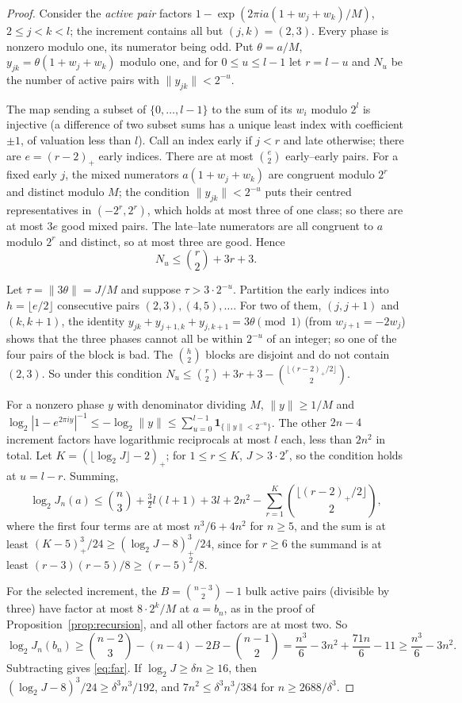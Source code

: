 \documentclass[11pt,a4paper]{article}
\theoremstyle{definition}
\begin{document}
\begin{proof}
Consider the \emph{active pair} factors $1-\exp(2\pi ia(1+w_j+w_k)/M)$,
$2\le j<k<l$; the increment contains all but $(j,k)=(2,3)$. Every phase is
nonzero modulo one, its numerator being odd. Put $\theta=a/M$,
$y_{jk}=\theta(1+w_j+w_k)$ modulo one, and for $0\le u\le l-1$ let $r=l-u$ and
$N_u$ be the number of active pairs with $\|y_{jk}\|<2^{-u}$.

The map sending a subset of $\{0,\dots,l-1\}$ to the sum of its $w_i$ modulo
$2^l$ is injective (a difference of two subset sums has a unique least index
with coefficient $\pm1$, of valuation less than $l$). Call an index early if
$j<r$ and late otherwise; there are $e=(r-2)_+$ early indices. There are at
most $\binom e2$ early--early pairs. For a fixed early $j$, the mixed numerators
$a(1+w_j+w_k)$ are congruent modulo $2^r$ and distinct modulo $M$; the condition
$\|y_{jk}\|<2^{-u}$ puts their centred representatives in $(-2^r,2^r)$, which
holds at most three of one class; so there are at most $3e$ good mixed pairs.
The late--late numerators are all congruent to $a$ modulo $2^r$ and distinct,
so at most three are good. Hence
\begin{equation}\label{eq:Nu}
 N_u\le\binom r2+3r+3 .
\end{equation}

Let $\tau=\|3\theta\|=J/M$ and suppose $\tau>3\cdot2^{-u}$. Partition the early
indices into $h=\lfloor e/2\rfloor$ consecutive pairs $(2,3),(4,5),\dots$. For
two of them, $(j,j+1)$ and $(k,k+1)$, the identity
$y_{jk}+y_{j+1,k}+y_{j,k+1}=3\theta\pmod1$ (from $w_{j+1}=-2w_j$) shows that
the three phases cannot all be within $2^{-u}$ of an integer; so one of the four
pairs of the block is bad. The $\binom h2$ blocks are disjoint and do not
contain $(2,3)$. So under this condition
$N_u\le\binom r2+3r+3-\binom{\lfloor(r-2)_+/2\rfloor}2$.

For a nonzero phase $y$ with denominator dividing $M$, $\|y\|\ge1/M$ and
$\log_2|1-e^{2\pi iy}|^{-1}\le-\log_2\|y\|\le\sum_{u=0}^{l-1}
\mathbf1_{\{\|y\|<2^{-u}\}}$. The other $2n-4$ increment factors have
logarithmic reciprocals at most $l$ each, less than $2n^2$ in total. Let
$K=(\lfloor\log_2J\rfloor-2)_+$; for $1\le r\le K$, $J>3\cdot2^r$, so the
condition holds at $u=l-r$. Summing,
\[
 \log_2J_n(a)\le\binom n3+\tfrac32l(l+1)+3l+2n^2
 -\sum_{r=1}^K\binom{\lfloor(r-2)_+/2\rfloor}2 ,
\]
where the first four terms are at most $n^3/6+4n^2$ for $n\ge5$, and the sum is
at least $(K-5)_+^3/24\ge(\log_2J-8)_+^3/24$, since for $r\ge6$ the summand is
at least $(r-3)(r-5)/8\ge(r-5)^2/8$.

For the selected increment, the $B=\binom{n-3}2-1$ bulk active pairs
(divisible by three) have factor at most $8\cdot2^k/M$ at $a=b_n$, as in the
proof of Proposition~\ref{prop:recursion}, and all other factors are at most
two. So
\[
 \log_2J_n(b_n)\ge\binom{n-2}3-(n-4)-2B-\binom{n-1}2
 =\frac{n^3}6-3n^2+\frac{71n}6-11\ge\frac{n^3}6-3n^2 .
\]
Subtracting gives \eqref{eq:far}. If $\log_2J\ge\delta n\ge16$, then
$(\log_2J-8)^3/24\ge\delta^3n^3/192$, and $7n^2\le\delta^3n^3/384$ for
$n\ge2688/\delta^3$.
\end{proof}
\end{document}
